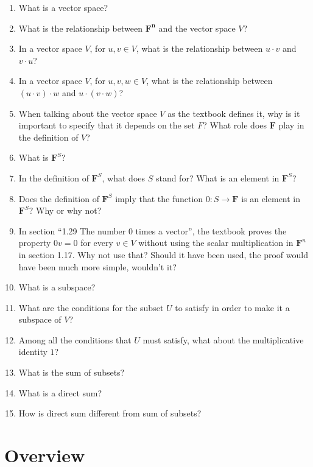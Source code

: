 \documentclass[12pt, letterpaper, oneside]{book}
\begin{document}
\begin{enumerate}
  \item What is a vector space?
  \item What is the relationship between $\mathbf{F^n}$ and the vector space
    $V$?
  \item In a vector space $V$, for $u, v \in V$, what is the relationship
    between $u \cdot v$ and $v \cdot u$?
  \item In a vector space $V$, for $u, v, w \in V$, what is the relationship
  between $(u \cdot v) \cdot w$ and $u \cdot (v \cdot w)$?
  \item When talking about the vector space $V$ as the textbook defines it, why
    is it important to specify that it depends on the set $F$? What role does
    $\mathbf{F}$ play in the definition of $V$?
  \item What is $\mathbf{F}^S$?
  \item In the definition of $\mathbf{F}^S$, what does $S$ stand for? What is
    an element in $\mathbf{F}^S$?
  \item Does the definition of $\mathbf{F}^S$ imply that the function
    $0: S \rightarrow \mathbf{F}$ is an element in $\mathbf{F}^S$? Why or why
    not?
  \item In section ``1.29 The number 0 times a vector'', the textbook proves
    the property $0v = 0$ for every $v \in V$ without using the scalar
    multiplication in $\mathbf{F}^n$ in section 1.17. Why not use that? Should
    it have been used, the proof would have been much more simple, wouldn't it?
  \item What is a subspace?
  \item What are the conditions for the subset $U$ to satisfy in order to make
    it a subspace of $V$?
  \item Among all the conditions that $U$ must satisfy, what about the
    multiplicative identity $1$?
  \item What is the sum of subsets?
  \item What is a direct sum?
  \item How is direct sum different from sum of subsets?
\end{enumerate}

\section{Overview}
\end{document}
